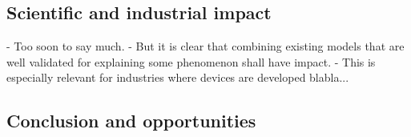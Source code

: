 \subsection{Scientific and industrial impact}
 - Too soon to say much.
 - But it is clear that combining existing models that are well validated for explaining some phenomenon shall have impact.
 - This is especially relevant for industries where devices are developed blabla...
\subsection{Conclusion and opportunities}
